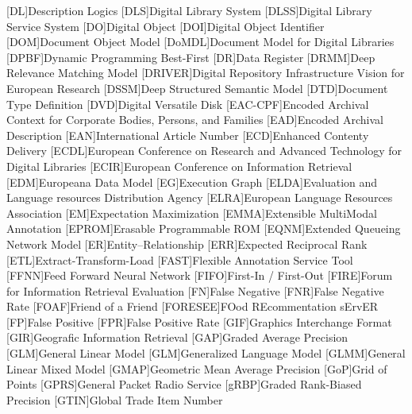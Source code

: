 [DL]{Description Logics}
[DLS]{Digital Library System}
[DLSS]{Digital Library Service System}
[DO]{Digital Object}
[DOI]{Digital Object Identifier}
[DOM]{Document Object Model}
[DoMDL]{Document Model for Digital Libraries}
[DPBF]{Dynamic Programming Best-First}
[DR]{Data Register}
[DRMM]{Deep Relevance Matching Model}
[DRIVER]{Digital Repository Infrastructure Vision for European Research}
[DSSM]{Deep Structured Semantic Model}
[DTD]{Document Type Definition}
[DVD]{Digital Versatile Disk}
[EAC-CPF]{Encoded Archival Context for Corporate Bodies, Persons, and Families}
[EAD]{Encoded Archival Description}
[EAN]{International Article Number}
[ECD]{Enhanced Contenty Delivery}
[ECDL]{European Conference on Research and Advanced Technology for Digital Libraries}
[ECIR]{European Conference on Information Retrieval}
[EDM]{Europeana Data Model}
[EG]{Execution Graph}
[ELDA]{Evaluation and Language resources Distribution Agency}
[ELRA]{European Language Resources Association}
[EM]{Expectation Maximization}
[EMMA]{Extensible MultiModal Annotation}
[EPROM]{Erasable Programmable \acs{ROM}}
[EQNM]{Extended Queueing Network Model}
[ER]{Entity--Relationship}
[ERR]{Expected Reciprocal Rank}
[ETL]{Extract-Transform-Load}
[FAST]{Flexible Annotation Service Tool}
[FFNN]{Feed Forward Neural Network}
[FIFO]{First-In / First-Out}
[FIRE]{Forum for Information Retrieval Evaluation}
[FN]{False Negative}
[FNR]{False Negative Rate}
[FOAF]{Friend of a Friend}
[FORESEE]{FOod REcommentation sErvER}
[FP]{False Positive}
[FPR]{False Positive Rate}
[GIF]{Graphics Interchange Format}
[GIR]{Geografic Information Retrieval}
[GAP]{Graded Average Precision}
[GLM]{General Linear Model}
[GLM]{Generalized Language Model}
[GLMM]{General Linear Mixed Model}
[GMAP]{Geometric Mean Average Precision}
[GoP]{Grid of Points}
[GPRS]{General Packet Radio Service}
[gRBP]{Graded Rank-Biased Precision}
[GTIN]{Global Trade Item Number}
